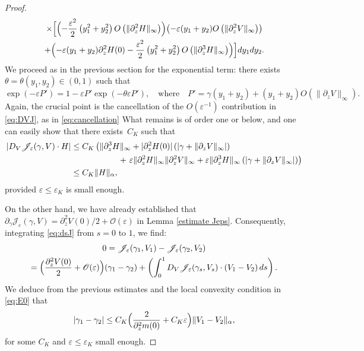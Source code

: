 \documentclass[JEP,XML,SOM,Unicode]{cedram}
\let\mathcal\mathscr
\newcommand{\cO}{\mathcal{O}}
\theoremstyle{plain}
\theoremstyle{definition}
\newcommand{\Je}{\mathcal{J}_\eps}
\let\eps\varepsilon
\newcommand{\abs}[1]{\left\lvert#1\right\rvert}
\begin{document}
\begin{proof}
\begin{multline}
\times
\Bigl[ \Bigl (- \frac{\eps^2}2\left (y_1^2 + y_2^2 \right) O\left (\|\partial_z^2 H\|_\infty \right) \Bigr) \bigl(-\eps (y_1 + y_2) O\left (\|\partial_z^2 V\|_\infty \right) \bigr) \\ +
\Bigl(-\eps (y_1 + y_2)\partial_z^2 H(0) - \frac{\eps^2}2\left (y_1^2 + y_2^2 \right) O\left (\|\partial_z^3H\|_\infty \right) \Bigr) \Bigr] d y_1 d y_2.
\end{multline}
We proceed as in the previous section for the exponential term: there exists $\theta = \theta(y_1,y_2)\in (0,1)$ such that
\begin{equation*}
\exp (- \eps P') = 1 - \eps P' \exp(-\theta \eps P'), \quad \text{where}\quad P' = \gamma (y_1+y_2) + (y_1 + y_2) O\left (\|\partial_z V\|_\infty \right).
\end{equation*}
Again, the crucial point is the cancellation of the $O(\eps^{-1})$ contribution in \eqref{eq:DVJ}, as in \eqref{eq:cancellation}
What remains is of order one or below, and one can easily show that there exists~$C_K$ such that
\begin{align*}
\abs{D_V \Je(\gamma,V)\cdot H}& \leq C_K \left (\|\partial_z^3H\|_\infty + |\partial_z^2 H(0)| \left (|\gamma + \|\partial_z V\|_\infty | \right) \right.\\
& \hspace*{2cm} + \left. \eps \|\partial_z^2H\|_\infty \|\partial_z^2V\|_\infty + \eps \|\partial_z^3H\|_\infty \left (|\gamma + \|\partial_z V\|_\infty | \right) \right)\\
& \leq C_K \|H\|_\alpha ,
\end{align*}
provided $\eps \leq \eps_K$ is small enough.

On the other hand, we have already established that $\partial_\gamma \Je(\gamma,V) = \partial_z^2 V(0)/2 + \cO(\eps)$ in Lemma \ref{estimate Jeps}. Consequently, integrating \eqref{eq:dsJ} from $s = 0$ to $1$, we find:
\begin{multline*}
0 = \Je(\gamma_1,V_1) - \Je(\gamma_2,V_2)\\
= \Bigl (\frac{\partial_z^2 V(0)}2 + \cO(\eps) \Bigr) (\gamma_1 - \gamma_2) + \left (\int_0^1 D_V \Je (\gamma_s,V_s)\cdot (V_1 - V_2)\, ds\right).
\end{multline*}
We deduce from the previous estimates and the local convexity condition in \eqref{eq:E0} that
\begin{equation*}
|\gamma_1 - \gamma_2| \leq C_K \Bigl (\dfrac{2 }{\partial_z^2m(0)} + C_K\eps \Bigr) \|V_1 - V_2\|_\alpha ,
\end{equation*}
for some $C_K$ and $\eps \leq \eps_K$ small enough.
\end{proof}
\end{document}
